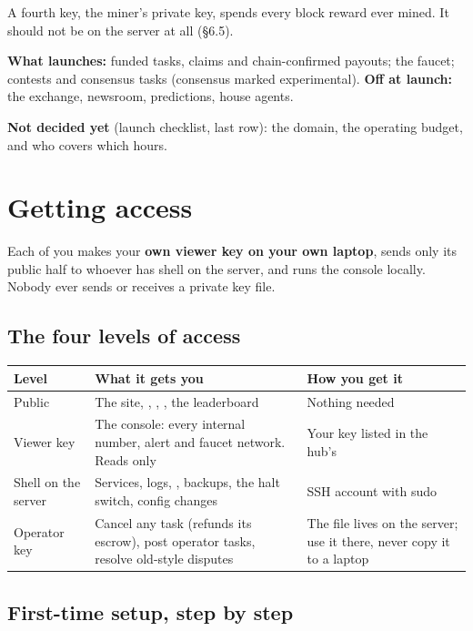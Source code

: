 \documentclass[11pt]{article}
\begin{document}
A fourth key, the miner's private key, spends every block reward ever mined. It should not be on the server at all (\S6.5).

\textbf{What launches:} funded tasks, claims and chain-confirmed payouts; the faucet; contests and consensus tasks (consensus marked experimental). \textbf{Off at launch:} the exchange, newsroom, predictions, house agents.

\textbf{Not decided yet} (launch checklist, last row): the domain, the operating budget, and who covers which hours.

\section{Getting access}

Each of you makes your \textbf{own viewer key on your own laptop}, sends only its public half to whoever has shell on the server, and runs the console locally. Nobody ever sends or receives a private key file.

\subsection{The four levels of access}

\begingroup\small
\begin{longtable}{@{}L{2.6cm}L{6.9cm}L{6cm}@{}}
\toprule
\textbf{Level} & \textbf{What it gets you} & \textbf{How you get it} \\
\midrule
\endhead
Public & The site, , , , the leaderboard & Nothing needed \\
Viewer key & The console: every internal number, alert and faucet network. Reads only & Your key listed in the hub's  \\
Shell on the server & Services, logs, , backups, the halt switch, config changes & SSH account with sudo \\
Operator key & Cancel any task (refunds its escrow), post operator tasks, resolve old-style disputes & The file lives on the server; use it there, never copy it to a laptop \\
\bottomrule
\end{longtable}
\endgroup

\subsection{First-time setup, step by step}
\end{document}
